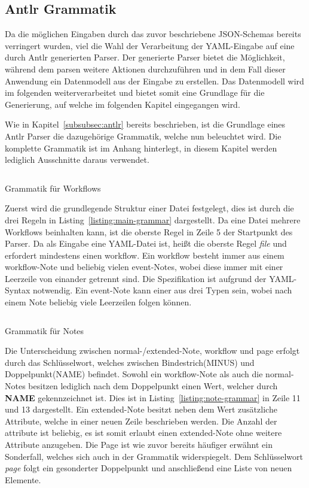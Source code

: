 \subsection{Antlr Grammatik}\label{subsec:antlr-grammatik}
Da die möglichen Eingaben durch das zuvor beschriebene JSON-Schemas bereits verringert wurden, viel die Wahl der Verarbeitung der YAML-Eingabe auf eine durch Antlr generierten Parser.
Der generierte Parser bietet die Möglichkeit, während dem parsen weitere Aktionen durchzuführen und in dem Fall dieser Anwendung ein Datenmodell aus der Eingabe zu erstellen.
Das Datenmodell wird im folgenden weiterverarbeitet und bietet somit eine Grundlage für die Generierung, auf welche im folgenden Kapitel eingegangen wird.

Wie in Kapitel~\ref{subsubsec:antlr} bereits beschrieben, ist die Grundlage eines Antlr Parser die dazugehörige Grammatik, welche nun beleuchtet wird.
Die komplette Grammatik ist im Anhang hinterlegt, in diesem Kapitel werden lediglich Ausschnitte daraus verwendet.

\begin{listing}[!ht]
    \inputminted[xleftmargin=20pt,linenos,firstnumber=5]{antlr}{listings/3.1/Main.g4}
    \caption{Grammatik für Workflows}
    \label{listing:main-grammar}
\end{listing}

Zuerst wird die grundlegende Struktur einer Datei festgelegt, dies ist durch die drei Regeln in Listing~\ref{listing:main-grammar} dargestellt.
Da eine Datei mehrere Workflows beinhalten kann, ist die oberste Regel in Zeile 5 der Startpunkt des Parser.
Da als Eingabe eine YAML-Datei ist, heißt die oberste Regel \textit{file} und erfordert mindestens einen workflow.
Ein workflow besteht immer aus einem workflow-Note und beliebig vielen event-Notes, wobei diese immer mit einer Leerzeile von einander getrennt sind.
Die Spezifikation ist aufgrund der YAML-Syntax notwendig.
Ein event-Note kann einer aus drei Typen sein, wobei nach einem Note beliebig viele Leerzeilen folgen können.

\begin{listing}[!ht]
    \inputminted[xleftmargin=20pt,linenos,firstnumber=11]{antlr}{listings/3.1/Note.g4}
    \caption{Grammatik für Notes}
    \label{listing:note-grammar}
\end{listing}

Die Unterscheidung zwischen normal-/extended-Note, workflow und page erfolgt durch das Schlüsselwort, welches zwischen Bindestrich(MINUS) und Doppelpunkt(NAME) befindet.
Sowohl ein workflow-Note als auch die normal-Notes besitzen lediglich nach dem Doppelpunkt einen Wert, welcher durch \textbf{NAME} gekennzeichnet ist.
Dies ist in Listing~\ref{listing:note-grammar} in Zeile 11 und 13 dargestellt.
Ein extended-Note besitzt neben dem Wert zusätzliche Attribute, welche in einer neuen Zeile beschrieben werden.
Die Anzahl der attribute ist beliebig, es ist somit erlaubt einen extended-Note ohne weitere Attribute anzugeben.
Die Page ist wie zuvor bereits häufiger erwähnt ein Sonderfall, welches sich auch in der Grammatik widerspiegelt.
Dem Schlüsselwort \textit{page} folgt ein gesonderter Doppelpunkt und anschließend eine Liste von neuen Elemente.

